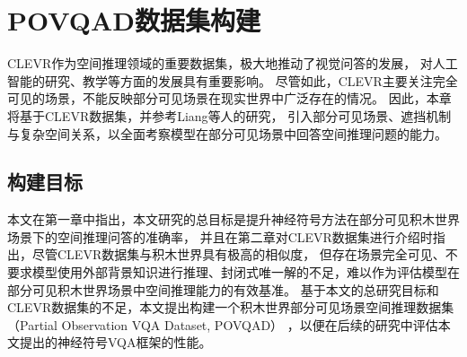 \chapter{POVQAD数据集构建}\label{dataset}
CLEVR作为空间推理领域的重要数据集，极大地推动了视觉问答的发展，
对人工智能的研究、教学等方面的发展具有重要影响。
尽管如此，CLEVR主要关注完全可见的场景，不能反映部分可见场景在现实世界中广泛存在的情况。
因此，本章将基于CLEVR数据集，并参考Liang\cite{liang2022visualabductivereasoning}等人的研究，
引入部分可见场景、遮挡机制与复杂空间关系，以全面考察模型在部分可见场景中回答空间推理问题的能力。

\section{构建目标}
本文在第一章中指出，本文研究的总目标是提升神经符号方法在部分可见积木世界场景下的空间推理问答的准确率，
并且在第二章对CLEVR数据集进行介绍时指出，尽管CLEVR数据集与积木世界具有极高的相似度，
但存在场景完全可见、不要求模型使用外部背景知识进行推理、封闭式唯一解的不足，难以作为评估模型在部分可见积木世界场景中空间推理能力的有效基准。
基于本文的总研究目标和CLEVR数据集的不足，本文提出构建一个积木世界部分可见场景空间推理数据集（Partial Observation VQA Dataset, POVQAD）
，以便在后续的研究中评估本文提出的神经符号VQA框架的性能。

